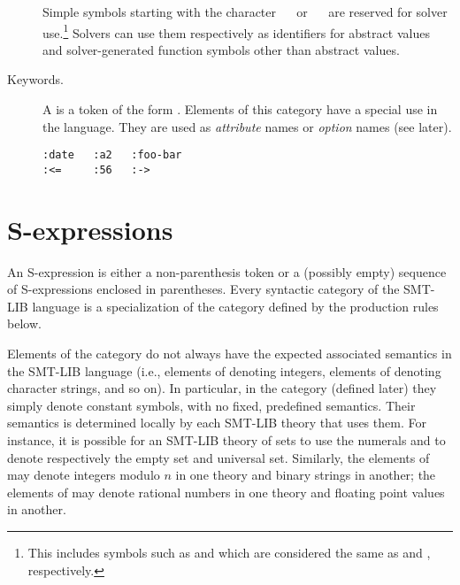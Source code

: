\begin{description}
Simple symbols starting with the character
\  \ or \  \  are reserved for solver use.\footnote{%
This includes symbols such as  and 
which are considered the same as  and , respectively.
}
Solvers can use them respectively as identifiers for abstract values and
solver-generated function symbols other than abstract values.


\item[Keywords.]
A  is
a token of the form {\ter{:}} .
Elements of this category have a special use in the language.
They are used as \emph{attribute} names or \emph{option} names (see later).

\begin{lstlisting}[linewidth=15em]
:date   :a2   :foo-bar
:<=     :56   :->
\end{lstlisting}
\end{description}




\section{S-expressions}

An S-expression is either a non-parenthesis token or 
a (possibly empty) sequence of S-ex\-press\-ions enclosed in parentheses.
Every syntactic category of the SMT-LIB language is a specialization
of the category  defined by the production rules below.
\bigskip

\sexpressions
\bigskip

\begin{remark}
Elements of the  category do not always have the expected
associated semantics in the SMT-LIB language
(i.e., elements of  denoting integers, 
elements of  denoting character strings, and so on).
In particular, in the  category (defined later) they simply denote
constant symbols, with no fixed, predefined semantics.
Their semantics is determined locally by each SMT-LIB theory that uses them.
For instance, it is possible for an SMT-LIB theory of sets to use 
the numerals  and  to denote respectively the empty set and 
universal set.
Similarly, the elements of  may denote integers modulo $n$ 
in one theory and binary strings in another;
the elements of  may denote rational numbers in one theory and 
floating point values in another.
\end{remark}




